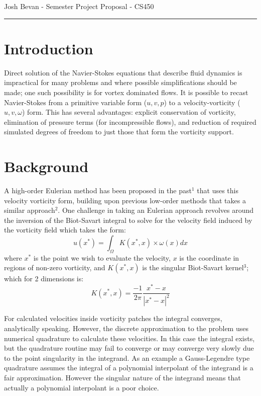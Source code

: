 \documentclass[letterpaper,10pt]{article}
\newcommand{\ben}[1]{\begin{equation}\label{#1}}
\newcommand{\ee}{\end{equation}}
\begin{document}
\begin{flushright}
{\Large Josh Bevan - Semester Project Proposal - CS450}
\end{flushright}
\vskip -0.1in
\hrule
\vskip 0.2in

\section*{Introduction}
Direct solution of the Navier-Stokes equations that describe fluid dynamics is impractical for many problems and where possible simplifications should be made; one such possibility is for vortex dominated flows. It is possible to recast Navier-Stokes from a primitive variable form ($u,v,p$) to a velocity-vorticity ($u,v,\omega$) form. This has several advantages: explicit conservation of vorticity, elimination of pressure terms (for incompressible flows), and reduction of required simulated degrees of freedom to just those that form the vorticity support.

\section*{Background}
A high-order Eulerian method has been proposed in the past$^1$ that uses this velocity vorticity form, building upon previous low-order methods that takes a similar approach$^2$. One challenge in taking an Eulerian approach revolves around the inversion of the Biot-Savart integral to solve for the velocity field induced by the vorticity field which takes the form:
\ben{BS} u(x^*) = \int_\Omega K(x^*,x) \times \omega(x) dx \ee
where $x^*$ is the point we wish to evaluate the velocity, $x$ is the coordinate in regions of non-zero vorticity, and $K(x^*,x)$ is the singular Biot-Savart kernel$^3$; which for 2 dimensions is:
\ben{BSkern} K(x^*,x) = \frac{-1}{2 \pi} \frac{x^*-x}{|x^*-x|^2} \ee

For calculated velocities inside vorticity patches the integral converges, analytically speaking. However, the discrete approximation to the problem uses numerical quadrature to calculate these velocities. In this case the integral exists, but the quadrature routine may fail to converge or may converge very slowly due to the point singularity in the integrand. As an example a Gauss-Legendre type quadrature assumes the integral of a polynomial interpolant of the integrand is a fair approximation. However the singular nature of the integrand means that actually a polynomial interpolant is a poor choice.
\end{document}
